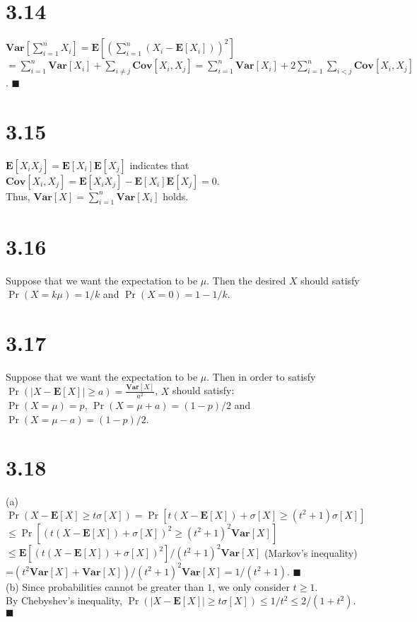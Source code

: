\documentclass{article}
\begin{document}
\section*{3.14}
$\textbf{Var}[\sum\limits_{i=1}^nX_i]=\textbf{E}\left[\left(\sum\limits_{i=1}^n(X_i-\textbf{E}[X_i])\right)^2\right]$
$=\sum\limits_{i=1}^n\textbf{Var}[X_i]+\sum\limits_{i\neq j}\textbf{Cov}[X_i,X_j]=\sum\limits_{i=1}^n\textbf{Var}[X_i]+2\sum\limits_{i=1}^n\sum\limits_{i<j}\textbf{Cov}[X_i,X_j]$. $\blacksquare$
\section*{3.15}
$\textbf{E}[X_iX_j]=\textbf{E}[X_i]\textbf{E}[X_j]$ indicates that $\textbf{Cov}[X_i,X_j]=\textbf{E}[X_iX_j]-\textbf{E}[X_i]\textbf{E}[X_j]=0$.\\
Thus, $\textbf{Var}[X]=\sum\limits_{i=1}^n\textbf{Var}[X_i]$ holds.
\section*{3.16}
Suppose that we want the expectation to be $\mu$.
Then the desired $X$ should satisfy $\Pr(X=k\mu)=1/k$ and $\Pr(X=0)=1-1/k$.
\section*{3.17}
Suppose that we want the expectation to be $\mu$.
Then in order to satisfy $\Pr(|X-\textbf{E}[X]|\geq a)=\frac{\textbf{Var}[X]}{a^2}$, $X$ should satisfy:\\
$\Pr(X=\mu)=p$, $\Pr(X=\mu+a)=(1-p)/2$ and $\Pr(X=\mu-a)=(1-p)/2$.
\section*{3.18}
(a) $\Pr(X-\textbf{E}[X]\geq t\sigma[X])=\Pr[t(X-\textbf{E}[X])+\sigma[X]\geq(t^2+1)\sigma[X]]$\\
$\leq\Pr[(t(X-\textbf{E}[X])+\sigma[X])^2\geq(t^2+1)^2\textbf{Var}[X]]$\\
$\leq \textbf{E}[(t(X-\textbf{E}[X])+\sigma[X])^2]/(t^2+1)^2\textbf{Var}[X]$ (Markov's inequality)\\
=$(t^2\textbf{Var}[X]+\textbf{Var}[X])/(t^2+1)^2\textbf{Var}[X]=1/(t^2+1)$. $\blacksquare$\\
(b) Since probabilities cannot be greater than $1$, we only consider $t \geq 1$.\\
By Chebyshev's inequality, $\Pr(|X-\textbf{E}[X]| \geq t\sigma[X]) \leq 1/t^2 \leq 2/(1+t^2)$. $\blacksquare$
\end{document}
